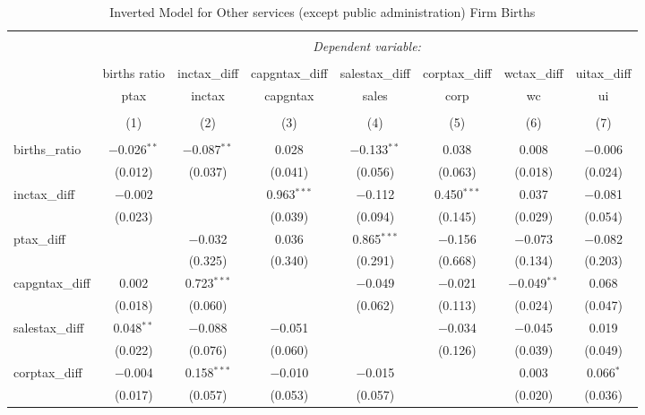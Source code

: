 
\begin{table}[!htbp] \centering 
  \caption{Inverted Model for  Other services (except public administration) Firm Births} 
  \label{81rd} 
\footnotesize 
\begin{tabular}{@{\extracolsep{5pt}}lccccccc} 
\\[-1.8ex]\hline 
\hline \\[-1.8ex] 
 & \multicolumn{7}{c}{\textit{Dependent variable:}} \\ 
\cline{2-8} 
\\[-1.8ex] & births ratio & inctax\_diff & capgntax\_diff & salestax\_diff & corptax\_diff & wctax\_diff & uitax\_diff \\ 
 & ptax & inctax & capgntax & sales & corp & wc & ui \\ 
\\[-1.8ex] & (1) & (2) & (3) & (4) & (5) & (6) & (7)\\ 
\hline \\[-1.8ex] 
 births\_ratio & $-$0.026$^{**}$ & $-$0.087$^{**}$ & 0.028 & $-$0.133$^{**}$ & 0.038 & 0.008 & $-$0.006 \\ 
  & (0.012) & (0.037) & (0.041) & (0.056) & (0.063) & (0.018) & (0.024) \\ 
  inctax\_diff & $-$0.002 &  & 0.963$^{***}$ & $-$0.112 & 0.450$^{***}$ & 0.037 & $-$0.081 \\ 
  & (0.023) &  & (0.039) & (0.094) & (0.145) & (0.029) & (0.054) \\ 
  ptax\_diff &  & $-$0.032 & 0.036 & 0.865$^{***}$ & $-$0.156 & $-$0.073 & $-$0.082 \\ 
  &  & (0.325) & (0.340) & (0.291) & (0.668) & (0.134) & (0.203) \\ 
  capgntax\_diff & 0.002 & 0.723$^{***}$ &  & $-$0.049 & $-$0.021 & $-$0.049$^{**}$ & 0.068 \\ 
  & (0.018) & (0.060) &  & (0.062) & (0.113) & (0.024) & (0.047) \\ 
  salestax\_diff & 0.048$^{**}$ & $-$0.088 & $-$0.051 &  & $-$0.034 & $-$0.045 & 0.019 \\ 
  & (0.022) & (0.076) & (0.060) &  & (0.126) & (0.039) & (0.049) \\ 
  corptax\_diff & $-$0.004 & 0.158$^{***}$ & $-$0.010 & $-$0.015 &  & 0.003 & 0.066$^{*}$ \\ 
  & (0.017) & (0.057) & (0.053) & (0.057) &  & (0.020) & (0.036) \\ 

\end{tabular}
\end{table}
